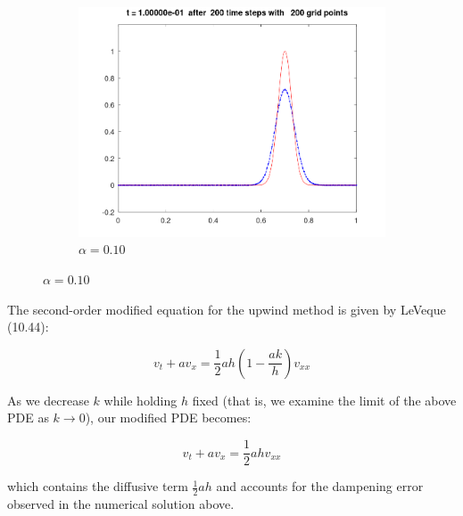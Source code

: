 \begin{solution}
\begin{figure}[h]
\begin{subfigure}[b]{0.45\textwidth}
            \includegraphics[width=\textwidth]{problem_3c_alpha-0.10.png}
            \caption{$\alpha = 0.10$}
        \end{subfigure}
    \end{figure}

    \pagebreak
    The second-order modified equation for the upwind method is given by LeVeque (10.44):
    
    $$
    v_t + av_x = \frac{1}{2}ah \left(1 - \frac{ak}{h}\right)v_{xx}
    $$

    As we decrease $k$ while holding $h$ fixed (that is, we examine the limit of the above PDE as $k \to 0$), our 
    modified PDE becomes:

    $$
    v_t + av_x = \frac{1}{2}ah v_{xx}
    $$

    which contains the diffusive term $\frac{1}{2} ah$ and accounts for the dampening error observed in the numerical 
    solution above.
    \ \\
\end{solution}
